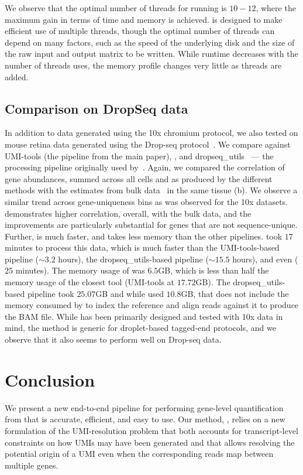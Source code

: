 We observe that the optimal number of threads for running \alevin is $10-12$, where the maximum gain in terms of time and memory is achieved. \Alevin is designed to make efficient use of multiple threads, though the optimal number of threads can depend on many factors, such as the speed of the underlying disk and the size of the raw input and output matrix to be written. While runtime decreases with the number of threads uses, the memory profile changes very little as threads are added. 

\subsection{Comparison on DropSeq data}
In addition to data generated using the 10x chromium protocol\citep{tenx}, we 
also tested \alevin on mouse retina data generated using the Drop-seq protocol~\citep{dropseq}. 
We compare \alevin against UMI-tools (the \naive pipeline    
from the main paper), \dropest, and dropseq\_utils~\citep{dropseq} --- the processing    
pipeline originally used by~\citet{dropseq}.   
 Again, we compared the correlation of gene abundances, summed across all cells    
and as produced by the different methods with the estimates from bulk    
data~\citep{mouse_retina} in the same tissue (b). We observe a    
similar trend across gene-uniqueness bins as was observed for the 10x datasets.    
\Alevin demonstrates higher correlation, overall, with the bulk data, and the    
improvements are particularly substantial for genes that are not    
sequence-unique. Further, \alevin is much faster, and takes less memory than    
the other pipelines. \Alevin took $17$ minutes to process this data, which is much faster than the UMI-tools-based    
pipeline ($\sim3.2$ hours), the dropseq\_utils-based pipeline ($\sim15.5$    
hours), and even \dropest ($25$ minutes). The memory usage of \alevin was $6.5$GB, which is less than half the    
memory usage of the closest tool (UMI-tools at $17.72$GB).
The dropseq\_utils-based pipeline took $25.07$GB and while \dropest used
$10.8$GB, that does not include the memory consumed by \cellr to index the reference and align reads against it to
produce the BAM file.
While \alevin has been primarily designed and tested with 10x data in mind, the method
is generic for droplet-based tagged-end protocols, and we observe that it also seems to perform
well on Drop-seq data. 

\section{Conclusion}
We present a new end-to-end pipeline for performing gene-level quantification
from \dscrnaseq that is accurate, efficient, and easy to use. Our method,
\Alevin, relies on a new formulation of the UMI-resolution problem that both
accounts for transcript-level constraints on how UMIs may have been generated
and that allows resolving the potential origin of a UMI even when the
corresponding reads map between multiple genes.

